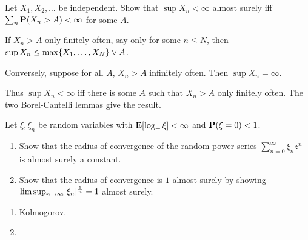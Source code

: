 \documentclass[12pt]{article}
\begin{document}
\begin{problem*}
    Let $X_1, X_2, \dots$ be independent.
    Show that $\sup X_n < \infty$ almost surely iff
    $\sum_n \P(X_n > A) < \infty$ for some $A$.
\end{problem*}
\begin{solution}
    If $X_n > A$ only finitely often, say only for some $n \le N$,
    then $\sup X_n \le \max\set{X_1, \dots, X_N} \vee A$.

    Conversely, suppose for all $A$, $X_n > A$ infinitely often.
    Then $\sup X_n = \infty$.

    Thus $\sup X_n < \infty$ iff there is some $A$ such that
    $X_n > A$ only finitely often.
    The two Borel-Cantelli lemmas give the result.
\end{solution}

\begin{problem*}
    Let $\xi, \xi_n$ be \iid random variables with $\E[\log_+ \xi] < \infty$
    and $\P(\xi = 0) < 1$.
    \begin{enumerate}
        \item Show that the radius of convergence of the random power series
        $\sum_{n=0}^\infty \xi_n z^n$ is almost surely a constant.
        \item Show that the radius of convergence is $1$ almost surely by
        showing $\limsup_{n \to \infty} \abs{\xi_n}^{\frac1n} = 1$ almost
        surely.
    \end{enumerate}
\end{problem*}
\begin{solution} \leavevmode
    \begin{enumerate}
        \item Kolmogorov.
        \item 
    \end{enumerate}
\end{solution}
\end{document}
